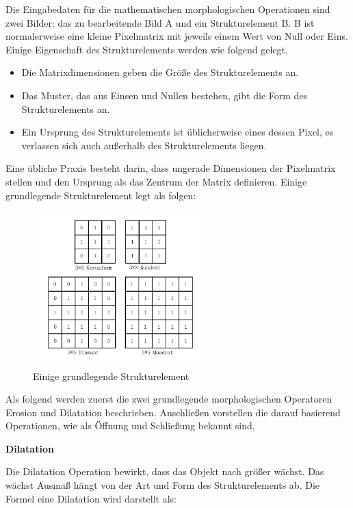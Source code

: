 Die Eingabedaten für die mathematischen morphologischen Operationen sind zwei Bilder: das zu bearbeitende Bild A und ein Strukturelement B. B ist normalerweise eine kleine Pixelmatrix mit jeweils einem Wert von Null oder Eins. Einige Eigenschaft des Strukturelements werden wie folgend gelegt.

\begin{itemize}

\item Die Matrixdimensionen geben die Größe des Strukturelements an.
\item Das Muster, das aus Einsen und Nullen bestehen, gibt die Form des Strukturelements an.
\item Ein Ursprung des Strukturelements ist üblicherweise eines dessen Pixel, es verlassen sich auch außerhalb des Strukturelements liegen. 

\end{itemize}

Eine übliche Praxis besteht darin, dass ungerade Dimensionen der Pixelmatrix stellen und den Ursprung als das Zentrum der Matrix definieren. Einige grundlegende Strukturelement legt als folgen:

\begin{figure}[htb]
 \centering 
  \includegraphics[keepaspectratio,width=0.6\textwidth]{images/4_ZweiteErfahrung/Morphological/strelement.pdf}
 \caption{Einige grundlegende Strukturelement}
 \label{fig:Strukturelement}
\end{figure} 

Als folgend werden zuerst die zwei grundlegende morphologischen Operatoren Erosion und Dilatation beschrieben. Anschließen vorstellen die darauf basierend Operationen, wie als Öffnung und Schließung bekannt sind.

\textbf{Dilatation}

Die Dilatation Operation bewirkt, dass das Objekt nach größer wächst. Das wächst Ausmaß hängt von der Art und Form des Strukturelements ab. Die Formel eine Dilatation wird darstellt als:

